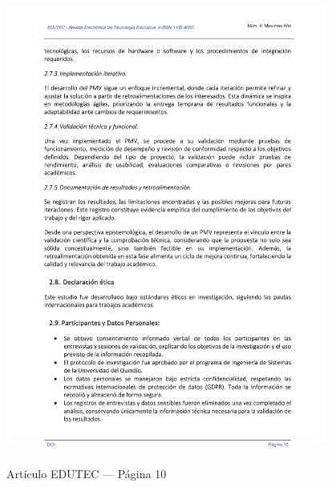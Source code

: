 \begin{figure}[H]
    \centering
    \begin{tcolorbox}[
        colback=white,
        colframe=gray!50,
        boxrule=1pt,
        arc=2pt,
        boxsep=5pt,
        left=3pt,
        right=3pt,
        top=3pt,
        bottom=3pt,
        drop shadow
    ]
        \includegraphics[width=0.95\textwidth,keepaspectratio]{apendices/EDUTEC/10.png}
    \end{tcolorbox}
    \caption{Artículo EDUTEC --- Página 10}\label{fig:edutec-pagina-10}
\end{figure}
\FloatBarrier


